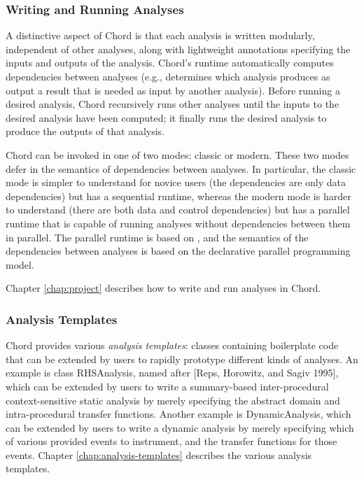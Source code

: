 \subsubsection*{Writing and Running Analyses}

A distinctive aspect of Chord is that each analysis is written modularly, independent of other analyses, along with lightweight
annotations specifying the inputs and outputs of the analysis.
Chord's runtime automatically computes
dependencies between analyses (e.g., determines which analysis produces as output a
result that is needed as input by another analysis).  Before running a desired analysis,
Chord recursively runs other analyses until the inputs to the desired analysis have been computed; it
finally runs the desired analysis to produce the outputs of that analysis.

Chord can be invoked in one of two modes: classic or modern.
These two modes defer in the semantics of dependencies between analyses.  In particular, the classic mode
is simpler to understand for novice users (the dependencies are only data dependencies) but has a sequential
runtime, whereas the modern mode is harder to understand (there are both data and control dependencies)
but has a parallel runtime that is capable of running analyses without dependencies between
them in parallel.  The parallel runtime is based on ,
and the semantics of the dependencies between analyses is based on the
 declarative parallel
programming model.

Chapter \ref{chap:project} describes how to write and run analyses in Chord.

\subsubsection*{Analysis Templates}

Chord provides various {\it analysis templates}: classes containing boilerplate code that can be
extended by users to rapidly prototype different kinds of analyses.  An example is class RHSAnalysis,
named after [Reps, Horowitz, and Sagiv 1995], which can be extended by users to write a summary-based inter-procedural
context-sensitive static analysis by merely specifying the abstract domain and intra-procedural transfer functions.
Another example is DynamicAnalysis, which can be extended by
users to write a dynamic analysis by merely specifying which of various provided events to instrument, and
the transfer functions for those events.
Chapter \ref{chap:analysis-templates} describes the various analysis templates.

